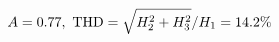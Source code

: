 \documentclass[preview]{standalone}
\begin{document}
\begin{align*}
\special{dvisvgm:raw <g id='unique000'>}A=0.77,\ \text{THD}=\sqrt{H_2^2+H_3^2}/H_1=14.2\%\special{dvisvgm:raw </g>}
\end{align*}
\end{document}
